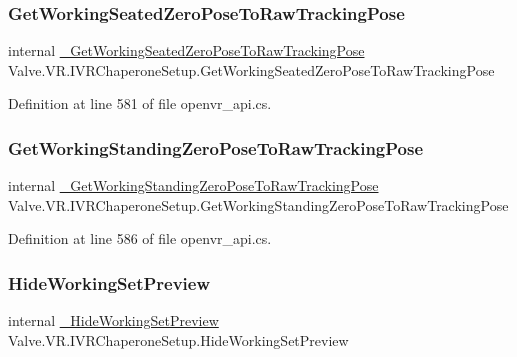 \subsubsection{\texorpdfstring{GetWorkingSeatedZeroPoseToRawTrackingPose}{GetWorkingSeatedZeroPoseToRawTrackingPose}}
{\footnotesize\ttfamily internal \mbox{\hyperlink{struct_valve_1_1_v_r_1_1_i_v_r_chaperone_setup_af9e02f945345cc16c02e09a55ae07afa}{\+\_\+\+Get\+Working\+Seated\+Zero\+Pose\+To\+Raw\+Tracking\+Pose}} Valve.\+V\+R.\+I\+V\+R\+Chaperone\+Setup.\+Get\+Working\+Seated\+Zero\+Pose\+To\+Raw\+Tracking\+Pose}



Definition at line 581 of file openvr\+\_\+api.\+cs.

\mbox{\label{struct_valve_1_1_v_r_1_1_i_v_r_chaperone_setup_a60bd7d96476f3b391250eb3700074fd9}} 
\subsubsection{\texorpdfstring{GetWorkingStandingZeroPoseToRawTrackingPose}{GetWorkingStandingZeroPoseToRawTrackingPose}}
{\footnotesize\ttfamily internal \mbox{\hyperlink{struct_valve_1_1_v_r_1_1_i_v_r_chaperone_setup_a45b2110871b615dbde696e6f11cfedba}{\+\_\+\+Get\+Working\+Standing\+Zero\+Pose\+To\+Raw\+Tracking\+Pose}} Valve.\+V\+R.\+I\+V\+R\+Chaperone\+Setup.\+Get\+Working\+Standing\+Zero\+Pose\+To\+Raw\+Tracking\+Pose}



Definition at line 586 of file openvr\+\_\+api.\+cs.

\mbox{\label{struct_valve_1_1_v_r_1_1_i_v_r_chaperone_setup_a1729d3b373a93ea2d9d610210f3a876b}} 
\subsubsection{\texorpdfstring{HideWorkingSetPreview}{HideWorkingSetPreview}}
{\footnotesize\ttfamily internal \mbox{\hyperlink{struct_valve_1_1_v_r_1_1_i_v_r_chaperone_setup_a403f94b7d21f3dbf8c27c3de8b346bce}{\+\_\+\+Hide\+Working\+Set\+Preview}} Valve.\+V\+R.\+I\+V\+R\+Chaperone\+Setup.\+Hide\+Working\+Set\+Preview}



